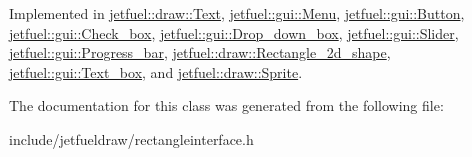 Implemented in \hyperlink{classjetfuel_1_1draw_1_1Text_a362996e996d471729944eebdff1f7636}{jetfuel\+::draw\+::\+Text}, \hyperlink{classjetfuel_1_1gui_1_1Menu_a1d5c050dcad48008898eafe2d610eff6}{jetfuel\+::gui\+::\+Menu}, \hyperlink{classjetfuel_1_1gui_1_1Button_a99615af8c169d2274b1593a29fdaf7ca}{jetfuel\+::gui\+::\+Button}, \hyperlink{classjetfuel_1_1gui_1_1Check__box_a09feae5781a788df462be6276e2d1c54}{jetfuel\+::gui\+::\+Check\+\_\+box}, \hyperlink{classjetfuel_1_1gui_1_1Drop__down__box_ab07ac526f3c2e9930398d78c7cad2d52}{jetfuel\+::gui\+::\+Drop\+\_\+down\+\_\+box}, \hyperlink{classjetfuel_1_1gui_1_1Slider_abab31dbe01b716b4e82919f0d8aba96c}{jetfuel\+::gui\+::\+Slider}, \hyperlink{classjetfuel_1_1gui_1_1Progress__bar_a4a09c3d515c9754b8295a4b5d83291ff}{jetfuel\+::gui\+::\+Progress\+\_\+bar}, \hyperlink{classjetfuel_1_1draw_1_1Rectangle__2d__shape_a1ed2975565e629d2b8d3fffa0a4756b2}{jetfuel\+::draw\+::\+Rectangle\+\_\+2d\+\_\+shape}, \hyperlink{classjetfuel_1_1gui_1_1Text__box_ae4cec83c8751ad592f1005e7c7c6441b}{jetfuel\+::gui\+::\+Text\+\_\+box}, and \hyperlink{classjetfuel_1_1draw_1_1Sprite_a2cd3f83c4fc573be82d3dc3a9c70e317}{jetfuel\+::draw\+::\+Sprite}.



The documentation for this class was generated from the following file\+:\begin{DoxyCompactItemize}
\item 
include/jetfueldraw/rectangleinterface.\+h\end{DoxyCompactItemize}
